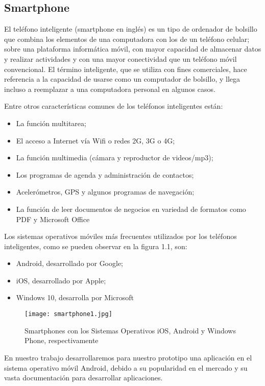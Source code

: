 \subsection{Smartphone}

\par
El teléfono inteligente (smartphone en inglés) es un tipo de ordenador de bolsillo que combina los elementos de una computadora con los de un teléfono celular; sobre una plataforma informática móvil, con mayor capacidad de almacenar datos y realizar actividades y con una mayor conectividad que un teléfono móvil convencional. El término inteligente, que se utiliza con fines comerciales, hace referencia a la capacidad de usarse como un computador de bolsillo, y llega incluso a reemplazar a una computadora personal en algunos casos\cite{smartphone}.

\par \noindent
Entre otros características comunes de los teléfonos inteligentes están:\cite{smartphone}

\begin{itemize}
\item La función multitarea;

\item El acceso a Internet vía Wifi o redes 2G, 3G o 4G;

\item La función multimedia (cámara y reproductor de videos/mp3);

\item Los programas de agenda y administración de contactos;

\item Acelerómetros, GPS y algunos programas de navegación;

\item La función de leer documentos de negocios en variedad de formatos como PDF y Microsoft Office
\end{itemize}

\par \noindent
Los sistemas operativos móviles más frecuentes utilizados por los teléfonos inteligentes, como se pueden observar en la figura 1.1, son:\cite{smartphone}

\begin{itemize}
\item Android, desarrollado por Google;

\item iOS, desarrollado por Apple;

\item Windows 10, desarrolla por Microsoft
\end{itemize}

\begin{figure}[H]
\texttt{[image: smartphone1.jpg]}
\caption{Smartphones con los Sistemas Operativos iOS, Android y Windows Phone, respectivamente}
\end{figure}

\par \noindent
En nuestro trabajo desarrollaremos para nuestro prototipo una aplicación en el sistema operativo móvil Android, debido a su popularidad en el mercado y su vasta documentación para desarrollar aplicaciones.

